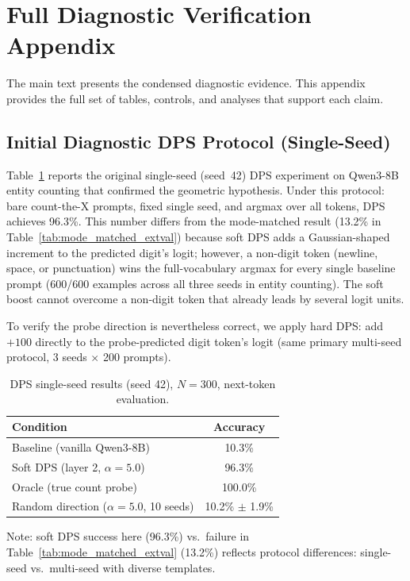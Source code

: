 \documentclass{article}
\begin{document}
\section{Full Diagnostic Verification Appendix}
\label{sec:appendix_dps}

The main text presents the condensed diagnostic evidence. This appendix provides
the full set of tables, controls, and analyses that support each claim.

\subsection{Initial Diagnostic DPS Protocol (Single-Seed)}
\label{sec:dps_initial}

Table~\ref{tab:dps} reports the original single-seed (seed~42) DPS experiment
on Qwen3-8B entity counting that confirmed the geometric hypothesis. Under this
protocol: bare count-the-X prompts, fixed single seed, and argmax over all
tokens, DPS achieves 96.3\%. This number differs from the mode-matched result
(13.2\% in Table~\ref{tab:mode_matched_extval}) because soft DPS adds a
Gaussian-shaped increment to the predicted digit's logit; however, a non-digit
token (newline, space, or punctuation) wins the full-vocabulary argmax for
every single baseline prompt (600/600 examples across all three seeds in entity
counting). The soft boost cannot overcome a non-digit token that already leads
by several logit units.

To verify the probe direction is nevertheless correct, we apply hard DPS: add
$+100$ directly to the probe-predicted digit token's logit (same primary
multi-seed protocol, 3 seeds $\times$ 200 prompts).

\begin{table}[h]
\centering
\caption{DPS single-seed results (seed 42), $N{=}300$, next-token evaluation.}
\label{tab:dps}
\begin{tabular}{lc}
\toprule
Condition & Accuracy \\
\midrule
Baseline (vanilla Qwen3-8B) & 10.3\% \\
Soft DPS (layer 2, $\alpha=5.0$) & 96.3\% \\
Oracle (true count probe) & 100.0\% \\
Random direction ($\alpha=5.0$, 10 seeds) & 10.2\% $\pm$ 1.9\% \\
\bottomrule
\end{tabular}
\vspace{3pt}
\par\scriptsize
Note: soft DPS success here (96.3\%) vs.\ failure in Table~\ref{tab:mode_matched_extval} (13.2\%) reflects
protocol differences: single-seed vs.\ multi-seed with diverse templates.
\end{table}
\end{document}

